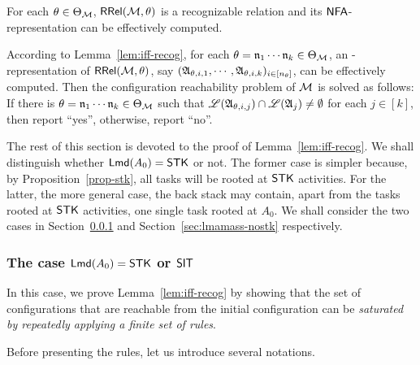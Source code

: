\begin{lemma}\label{lem:iff-recog}
    For each $\theta \in \Theta_{\mathcal{M} }$, $\mathsf{RRel}({\mathcal{M} }, \theta)$ is a recognizable relation and its $\textsf{NFA}$-representation can be effectively computed.
\end{lemma} 

According to Lemma~\ref{lem:iff-recog}, for each $\theta = \mathfrak{n}_1 \cdots \mathfrak{n}_k \in \Theta_{\mathcal{M} }$, an {\NFA}-representation of $\mathsf{RRel}({\mathcal{M} }, \theta)$, say $({\mathfrak{A} }_{\theta, i,1},\cdots,{\mathfrak{A} }_{\theta, i,k})_{i \in [n_\theta]}$, can be effectively computed. 
Then the configuration reachability problem of ${\mathcal{M} }$ is solved as follows: If there is $\theta =  \mathfrak{n}_1 \cdots \mathfrak{n}_k \in \Theta_{\mathcal{M} }$ such that ${\mathscr{L} }({\mathfrak{A} }_{\theta, i, j}) \cap {\mathscr{L} }({\mathfrak{A} }_j) \neq \emptyset$ for each $j \in [k]$, then report ``yes'', otherwise, report ``no''.

The rest of this section is devoted to the proof of Lemma~\ref{lem:iff-recog}. We shall distinguish whether ${\sf Lmd}(A_0) = \mathsf{STK}$ or not. 
The former case is simpler because, by Proposition~\ref{prop-stk}, all tasks will be rooted at $\mathsf{STK}$ activities. For the latter, the more general case, the back stack may contain, apart from the tasks rooted at $\mathsf{STK}$ activities, one single task rooted at $A_0$. 
We shall consider the two cases in Section~\ref{sec:lmamass-stk} and Section~\ref{sec:lmamass-nostk} respectively.



\subsubsection{The case ${\sf Lmd}(A_0) = \mathsf{STK}$ or $\mathsf{SIT}$}\label{sec:lmamass-stk}

In this case, we prove Lemma~\ref{lem:iff-recog} by showing that the set of configurations that are reachable from the initial configuration can be \emph{saturated by repeatedly applying a finite set of rules}. 

Before presenting the rules, let us introduce several notations. 

